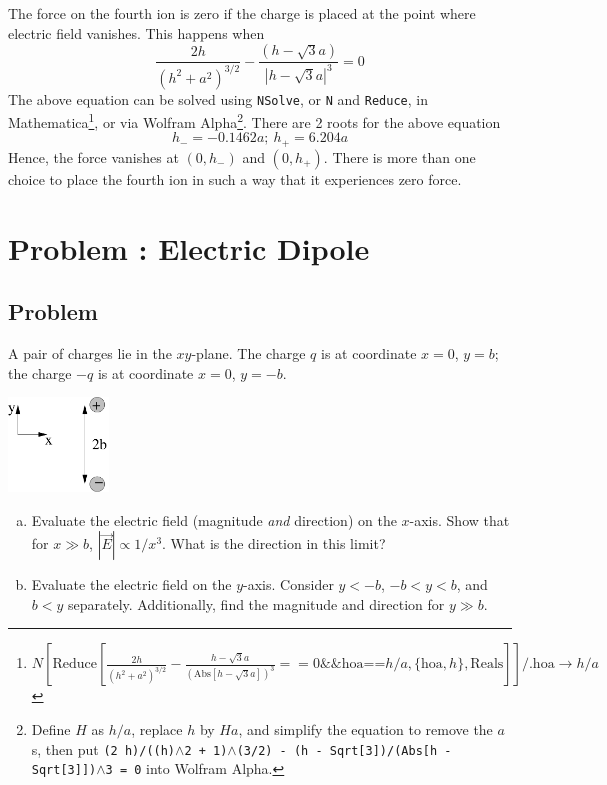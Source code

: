 \documentclass[solutions]{esg8022pset}
\begin{document}
  The force on the fourth ion is zero if the charge is placed at the point where electric field vanishes. This happens when
  \begin{equation*}
    \frac{2h}{(h^2 + a^2)^{3/2}} - \frac{(h - \sqrt3 a)}{|h - \sqrt3 a|^3} = 0
  \end{equation*}
  The above equation can be solved using \texttt{NSolve}, or \texttt{N} and \texttt{Reduce}, in Mathematica\footnote{$N\left[\text{Reduce}\left[\frac{2 h}{\left(h^2+a^2\right)^{3/2}}-\frac{h-\sqrt{3}a}{\left(\text{Abs}\left[h-\sqrt{3}a\right]\right)^3}==0\&\&\text{hoa}\text{==}h/ a,\{\text{hoa},h\},\text{Reals}\right]\right]\text{/.}\text{hoa}\to h/a$}, or via Wolfram Alpha\footnote{Define $H$ as $h / a$, replace $h$ by $H a$, and simplify the equation to remove the $a$s, then put \texttt{(2 h)/((h)$\wedge$2 + 1)$\wedge$(3/2) - (h - Sqrt[3])/(Abs[h - Sqrt[3]])$\wedge$3 = 0} into Wolfram Alpha.}. There are 2 roots for the above equation
  $$h_- = -0.1462a;\ h_+ = 6.204a$$
  Hence, the force vanishes at $(0, h_-)$ and $(0, h_+)$. There is more than one choice to place the fourth ion in such a way that it experiences zero force.
\section{Problem \thesection: Electric Dipole}
\subsection{Problem}
  A pair of charges lie in the $xy$-plane.  The charge $q$ is at coordinate $x = 0$, $y = b$; the charge $-q$ is at coordinate $x = 0$, $y = -b$.
  \begin{center}\includegraphics[width=0.2\textwidth]{ps01_8}\end{center}
  \begin{enumerate}[(a)]
    \item Evaluate the electric field (magnitude \emph{and} direction) on the $x$-axis.  Show that for $x \gg b$, $|\vec E| \propto 1 / x^3$.  What is the direction in this limit?
    \item Evaluate the electric field on the $y$-axis.  Consider $y < -b$, $-b < y < b$, and $b < y$ separately.  Additionally, find the magnitude and direction for $y \gg b$.
  \end{enumerate}
\end{document}
